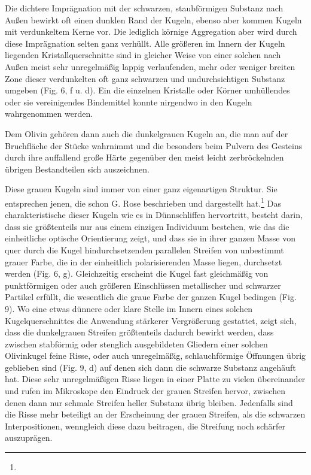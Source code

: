 \documentclass[a4paper, 11pt, oneside]{article}
\begin{document}
Die dichtere Imprägnation mit der schwarzen, staubförmigen Substanz nach Außen bewirkt oft einen dunklen Rand der Kugeln, ebenso aber kommen Kugeln mit verdunkeltem Kerne vor. Die lediglich körnige Aggregation aber wird durch diese Imprägnation selten ganz verhüllt. Alle größeren im Innern der Kugeln liegenden Kristallquerschnitte sind in gleicher Weise von einer solchen nach Außen meist sehr unregelmäßig lappig verlaufenden, mehr oder weniger breiten Zone dieser verdunkelten oft ganz schwarzen und undurchsichtigen Substanz umgeben (Fig. 6, f u. d). Ein die einzelnen Kristalle oder Körner umhüllendes oder sie vereinigendes Bindemittel konnte nirgendwo in den Kugeln wahrgenommen werden.

Dem Olivin gehören dann auch die dunkelgrauen Kugeln an, die man auf der Bruchfläche der Stücke wahrnimmt und die besonders beim Pulvern des Gesteins durch ihre auffallend große Härte gegenüber den meist leicht zerbröckelnden übrigen Bestandteilen sich auszeichnen.

Diese grauen Kugeln sind immer von einer ganz eigenartigen Struktur. Sie entsprechen jenen, die schon G. Rose beschrieben und dargestellt hat.\footnote{} Das charakteristische dieser Kugeln wie es in Dünnschliffen hervortritt, besteht darin, dass sie größtenteils nur aus einem einzigen Individuum bestehen, wie das die einheitliche optische Orientierung zeigt, und dass sie in ihrer ganzen Masse von quer durch die Kugel hindurchsetzenden parallelen Streifen von unbestimmt grauer Farbe, die in der einheitlich polarisierenden Masse liegen, durchsetzt werden (Fig. 6, g). Gleichzeitig erscheint die Kugel fast gleichmäßig von punktförmigen oder auch größeren Einschlüssen metallischer und schwarzer Partikel erfüllt, die wesentlich die graue Farbe der ganzen Kugel bedingen (Fig. 9). Wo eine etwas dünnere oder klare Stelle im Innern eines solchen Kugelquerschnittes die Anwendung stärkerer Vergrößerung gestattet, zeigt sich, dass die dunkelgrauen Streifen größtenteils dadurch bewirkt werden, dass zwischen stabförmig oder stenglich ausgebildeten Gliedern einer solchen Olivinkugel feine Risse, oder auch unregelmäßig, schlauchförmige Öffnungen übrig geblieben sind (Fig. 9, d) auf denen sich dann die schwarze Substanz angehäuft hat. Diese sehr unregelmäßigen Risse liegen in einer Platte zu vielen übereinander und rufen im Mikroskope den Eindruck der grauen Streifen hervor, zwischen denen dann nur schmale Streifen heller Substanz übrig bleiben. Jedenfalls sind die Risse mehr beteiligt an der Erscheinung der grauen Streifen, als die schwarzen Interpositionen, wenngleich diese dazu beitragen, die Streifung noch schärfer auszuprägen.
\end{document}
